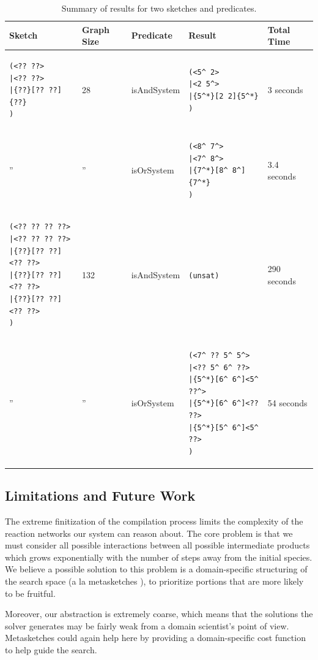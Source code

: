 \documentclass{article}
\begin{document}
\begin{table}
\centering
\begin{tabular}{|l|l|l|l|l|}\hline
Sketch     &  Graph Size &  Predicate &  Result  & Total Time \\ \hline
\begin{lstlisting}
(<?? ??>
|<?? ??>
|{??}[?? ??]{??}
)
\end{lstlisting}
&
28
&
isAndSystem
&
\begin{lstlisting}
(<5^ 2>
|<2 5^>
|{5^*}[2 2]{5^*}
)
\end{lstlisting}
&
3 seconds
\\ \hline
''
&
''
&
isOrSystem
&
\begin{lstlisting}
(<8^ 7^>
|<7^ 8^>
|{7^*}[8^ 8^]{7^*}
)
\end{lstlisting}
&
3.4 seconds
\\ \hline
\begin{lstlisting}
(<?? ?? ?? ??>
|<?? ?? ?? ??>
|{??}[?? ??]<?? ??>
|{??}[?? ??]<?? ??>
|{??}[?? ??]<?? ??>
)
\end{lstlisting}
&
132
&
isAndSystem
&
\verb;(unsat);
&
290 seconds
\\ \hline
''
&
''
&
isOrSystem
&
\begin{lstlisting}
(<7^ ?? 5^ 5^>
|<?? 5^ 6^ ??>
|{5^*}[6^ 6^]<5^ ??^>
|{5^*}[6^ 6^]<?? ??>
|{5^*}[5^ 6^]<5^ ??>
)
\end{lstlisting}
&
54 seconds
\\ \hline
\end{tabular}
\caption{Summary of results for two sketches and predicates.}
\label{table:results}
\end{table}

\subsection{Limitations and Future Work}
The extreme finitization of the compilation process limits the complexity
of the reaction networks our system can reason about. The core problem is
that we must consider all possible interactions between all possible
intermediate products which grows exponentially with the number of steps away
from the initial species. We believe a possible solution to this problem
is a domain-specific structuring of the search space (a la metasketches
\cite{metasketches}), to prioritize portions that are more likely to be
fruitful.

Moreover, our abstraction is extremely coarse, which means that the
solutions the solver generates may be fairly weak from a domain scientist's
point of view. Metasketches could again help here by providing a domain-specific
cost function to help guide the search.
\end{document}
